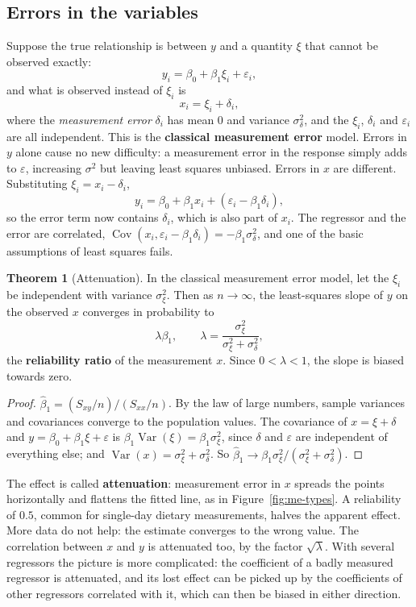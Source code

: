 \documentclass[11pt,a4paper]{article}
\numberwithin{equation}{section}
\theoremstyle{definition}
\newtheorem{thm}{Theorem}[subsection]
\begin{document}
\subsection{Errors in the variables}
Suppose the true relationship is between $y$ and a quantity $\xi$ that cannot be observed exactly:
\[
y_i = \beta_0 + \beta_1\xi_i + \varepsilon_i ,
\]
and what is observed instead of $\xi_i$ is
\[
x_i = \xi_i + \delta_i ,
\]
where the \emph{measurement error} $\delta_i$ has mean $0$ and variance $\sigma_\delta^2$, and the $\xi_i$, $\delta_i$ and $\varepsilon_i$ are all
independent. This is the \textbf{classical measurement error} model. Errors in $y$ alone cause no new
difficulty: a measurement error in the response simply adds to $\varepsilon$, increasing $\sigma^2$ but leaving least squares
unbiased. Errors in $x$ are different. Substituting $\xi_i = x_i - \delta_i$,
\[
y_i = \beta_0 + \beta_1x_i + (\varepsilon_i - \beta_1\delta_i) ,
\]
so the error term now contains $\delta_i$, which is also part of $x_i$. The regressor and the error are correlated,
$\operatorname{Cov}(x_i, \varepsilon_i - \beta_1\delta_i) = -\beta_1\sigma_\delta^2$, and one of the basic assumptions of least squares fails.

\begin{thm}[Attenuation]\label{thm:attenuation}
In the classical measurement error model, let the $\xi_i$ be independent with variance $\sigma_\xi^2$. Then as $n \to \infty$, the
least-squares slope of $y$ on the observed $x$ converges in probability to
\[
\lambda\beta_1 , \qquad \lambda = \frac{\sigma_\xi^2}{\sigma_\xi^2 + \sigma_\delta^2} ,
\]
the \textbf{reliability ratio} of the measurement $x$. Since $0 < \lambda < 1$, the slope is biased towards zero.
\end{thm}

\begin{proof}
$\hat\beta_1 = (S_{xy}/n)/(S_{xx}/n)$. By the law of large numbers, sample variances and covariances converge to the
population values. The covariance of $x = \xi + \delta$ and $y = \beta_0 + \beta_1\xi + \varepsilon$ is $\beta_1\operatorname{Var}(\xi) = \beta_1\sigma_\xi^2$, since $\delta$ and $\varepsilon$ are
independent of everything else; and $\operatorname{Var}(x) = \sigma_\xi^2 + \sigma_\delta^2$. So
$\hat\beta_1 \to \beta_1\sigma_\xi^2/(\sigma_\xi^2 + \sigma_\delta^2)$.
\end{proof}

The effect is called \textbf{attenuation}: measurement error in $x$ spreads the points horizontally and
flattens the fitted line, as in Figure~\ref{fig:me-types}. A reliability of $0.5$, common for single-day dietary
measurements, halves the apparent effect. More data do not help: the estimate converges to the wrong
value. The correlation between $x$ and $y$ is attenuated too, by the factor $\sqrt\lambda$. With several regressors the
picture is more complicated: the coefficient of a badly measured regressor is attenuated, and its lost
effect can be picked up by the coefficients of other regressors correlated with it, which can then be
biased in either direction.
\end{document}
